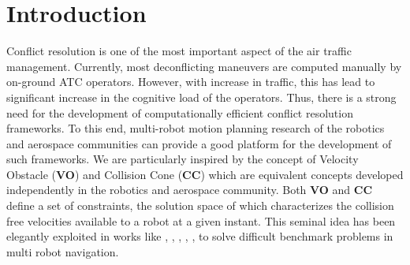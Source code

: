 \documentclass[letterpaper, 10 pt, conference]{IEEEtran}  %
\begin{document}
\begin{abstract}
\end{abstract}

\section{Introduction}


Conflict resolution is one of the most important aspect of the air traffic management. Currently, most deconflicting maneuvers are computed manually by on-ground ATC operators. However, with increase in traffic, this has lead to significant increase in the cognitive load of the operators. Thus, there is a strong need for the development of computationally efficient conflict resolution frameworks. To this end, multi-robot motion planning research of the robotics and aerospace communities can provide a good platform for the development of such frameworks. We are particularly inspired by the concept of Velocity Obstacle (\textbf{VO}) \cite{vo} and Collision Cone  (\textbf{CC}) \cite{ghose} which are equivalent concepts developed independently in the robotics and aerospace community. Both \textbf{VO} and \textbf{CC} define a set of constraints, the solution space of which characterizes the collision free velocities available to a robot at a given instant. This seminal idea has been elegantly exploited in works like \cite{rvo}, \cite{avo} \cite{orca}, \cite{alonzo1}, \cite{joint_util}, \cite{motion_cont}, to solve difficult benchmark problems in multi robot navigation. 
\end{document}
